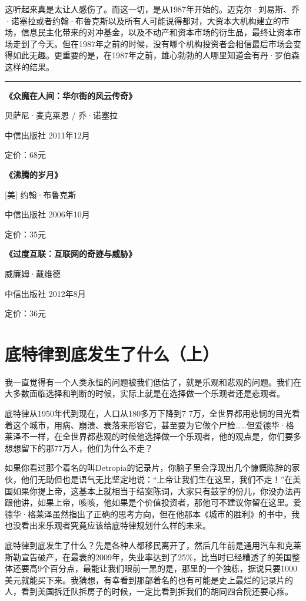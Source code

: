 这听起来真是太让人感伤了。而这一切，是从1987年开始的。迈克尔·刘易斯、乔·诺塞拉或者约翰·布鲁克斯以及所有人可能说得都对，大资本大机构建立的市场，信息民主化带来的对冲基金，以及不动产和资本市场的衍生品，最终让资本市场走到了今天。但在1987年之前的时候，没有哪个机构投资者会相信最后市场会变得如此无趣。更重要的是，在1987年之前，雄心勃勃的人哪里知道会有丹·罗伯森这样的结果。

\begin{center}\rule{3in}{0.4pt}\end{center}

\textbf{《众魔在人间：华尔街的风云传奇》}

贝萨尼·麦克莱恩 / 乔·诺塞拉

中信出版社 2011年12月

定价：68元

\textbf{《沸腾的岁月》}

{[}美{]} 约翰·布鲁克斯

中信出版社 2006年10月

定价：35元

\textbf{《过度互联：互联网的奇迹与威胁》}

威廉姆·戴维德

中信出版社 2012年8月

定价：36元

\section{底特律到底发生了什么（上）}

我一直觉得有一个人类永恒的问题被我们低估了，就是乐观和悲观的问题。我们在大多数面临选择和判断的时候，实际上就是在选择做一个乐观者还是悲观者。

底特律从1950年代到现在，人口从180多万下降到7
7万，全世界都用悲悯的目光看着这个城市，用病、崩溃、衰落来形容它，甚至要为它做个尸检\ldots{}\ldots{}但爱德华·格莱泽不一样，在全世界都悲观的时候他选择做一个乐观者，他的观点是，你们要多想想留下的那77万人，他们为什么不走？

如果你看过那个着名的叫Detropia的记录片，你脑子里会浮现出几个慷慨陈辞的家伙，他们无助但也是语气无比坚定地说：``上帝让我们生在这里，我们不走！''在美国如果你提上帝，这基本上就相当于结案陈词，大家只有鼓掌的份儿，你没办法再跟他讲，如果上帝，咳咳，他如果是个价值投资者，那他可不建议你留在这里。爱德华·格莱泽虽然指出了正确的思考方向，但在他那本《城市的胜利》的书中，我也没看出来乐观者究竟应该给底特律规划什么样的未来。

底特律到底发生了什么？先是各种人都移民离开了，然后几年前是通用汽车和克莱斯勒宣告破产，在最衰的2009年，失业率达到了25\%，比当时已经糟透了的美国整体还要高9个百分点，最能让我们眼前一黑的是，那里的一个独栋，据说只要1000美元就能买下来。我猜想，有幸看到那部着名的也有可能是史上最烂的记录片的人，看到美国拆迁队拆房子的时候，一定比看到拆我们的胡同四合院还要心疼。

